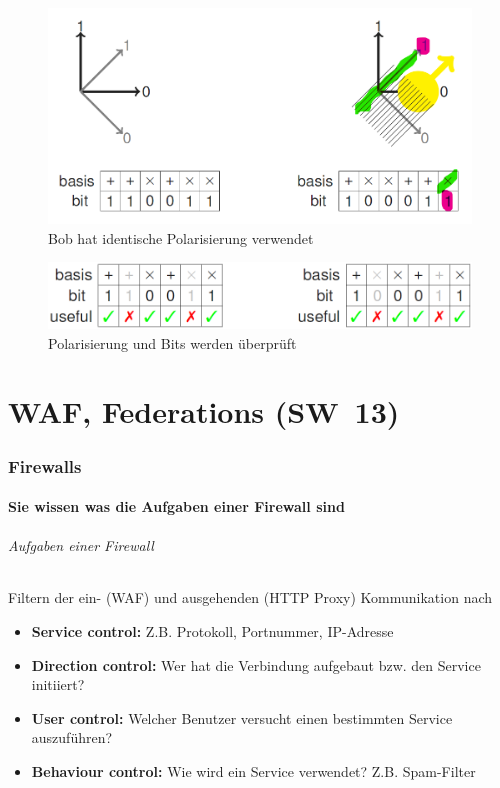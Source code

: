 \documentclass[10pt,a4paper]{article}
\begin{document}
\begin{figure}[H]
    \begin{center}
    \includegraphics[width=14cm]{images/Qubit3.png}
    \caption{Bob hat identische Polarisierung verwendet}
    \label{Qubit3}
    \end{center}
\end{figure}
\begin{figure}[H]
    \begin{center}
    \includegraphics[width=14cm]{images/Qubit4.png}
    \caption{Polarisierung und Bits werden überprüft}
    \label{Qubit4}
    \end{center}
\end{figure}


\pagebreak
\part{WAF, Federations (SW~13)}
\section{Firewalls}
\subsection*{Sie wissen was die Aufgaben einer Firewall sind}
\paragraph*{Aufgaben einer Firewall}Filtern der ein- (WAF) und ausgehenden (HTTP Proxy) Kommunikation nach
\begin{itemize}[noitemsep,topsep=0pt,leftmargin=*]
    \item \textbf{Service control:} Z.B. Protokoll, Portnummer, IP-Adresse
    \item \textbf{Direction control:} Wer hat die Verbindung aufgebaut bzw. den Service initiiert?
    \item \textbf{User control:} Welcher Benutzer versucht einen bestimmten Service auszuführen?
    \item \textbf{Behaviour control:} Wie wird ein Service verwendet? Z.B. Spam-Filter
\end{itemize}
\end{document}
